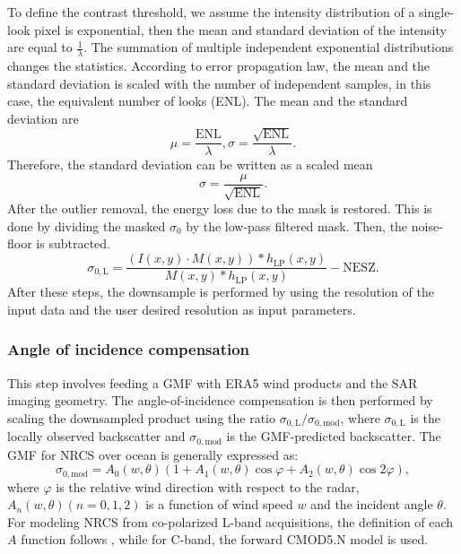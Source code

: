 To define the contrast threshold, we assume the intensity distribution of a single-look pixel is exponential, then the mean and standard deviation of the intensity are equal to $\frac{1}{\lambda}$. The summation of multiple independent exponential distributions changes the statistics. According to error propagation law, the mean and the standard deviation is scaled with the number of independent samples, in this case, the equivalent number of looks (ENL). The mean and the standard deviation are
\begin{equation}
    \mu = \frac{\mathrm{ENL}}{\lambda}, \sigma = \frac{\sqrt{\mathrm{ENL}}}{\lambda}.
\end{equation}
Therefore, the standard deviation can be written as a scaled mean
\begin{equation}
    \sigma = \frac{\mu}{\sqrt{\mathrm{ENL}}}.
\end{equation}
After the outlier removal, the energy loss due to the mask is restored. This is done by dividing the masked $\sigma_0$ by the low-pass filtered mask. Then, the noise-floor is subtracted. 
\begin{equation}
    \sigma_{0,\mathrm{L}} = \frac{(I(x,y)\cdot M(x,y))*h_{\mathrm{LP}}(x,y)}{M(x,y)*h_{\mathrm{LP}}(x,y)}-\mathrm{NESZ}.
\end{equation}
After these steps, the downsample is performed by using the resolution of the input data and the user desired resolution as input parameters.
\subsubsection{Angle of incidence compensation}
This step involves feeding a GMF with ERA5 wind products and the SAR imaging geometry. The angle-of-incidence compensation is then performed by scaling the downsampled product using the ratio $\sigma_{0,\mathrm{L}} / \sigma_{0,\mathrm{mod}}$, where $\sigma_{0,\mathrm{L}}$ is the locally observed backscatter and $\sigma_{0,\mathrm{mod}}$ is the GMF-predicted backscatter. The GMF for NRCS over ocean is generally expressed as:
\begin{equation}
    \sigma_{0,\mathrm{mod}}  = A_0(w,\theta)(1 + A_1(w,\theta)\cos{\varphi}+A_2(w,\theta)\cos{2\varphi}),
\end{equation}
where $\varphi$ is the relative wind direction with respect to the radar, $A_n(w,\theta)(n=0,1,2)$ is a function of wind speed $w$ and the incident angle $\theta$. For modeling NRCS from co-polarized L-band acquisitions, the definition of each $A$ function follows \cite{isoguchi_l-band_2009}, while for C-band, the forward CMOD5.N model is used.
